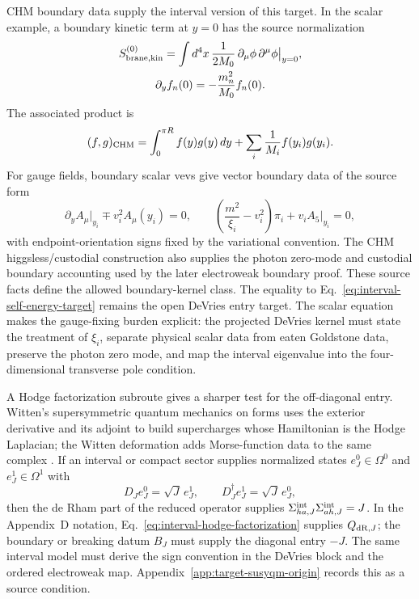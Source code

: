 CHM boundary data supply the interval version of this target.  In the scalar
example, a boundary kinetic term at \(y=0\) has the source normalization
\begin{equation}
  \begin{gathered}
  S_{\rm brane,kin}^{(0)}
  =
  \int d^4x\,\frac{1}{2M_0}\,
  \partial_\mu\phi\,\partial^\mu\phi\big|_{y=0},\\
  \partial_y f_n(0)
  =
  -\frac{m_n^2}{M_0}f_n(0).
  \end{gathered}
  \label{eq:chm-boundary-kinetic-source-normalization}
\end{equation}
The associated product is
\begin{equation}
  (f,g)_{\rm CHM}
  =
  \int_0^{\pi R} f(y)g(y)\,dy
  +
  \sum_i \frac{1}{M_i}f(y_i)g(y_i).
  \label{eq:chm-boundary-kinetic-data}
\end{equation}
For gauge fields, boundary scalar vevs give vector boundary data of the
source form
\begin{equation}
  \partial_y A_\mu\big|_{y_i}\mp v_i^2A_\mu(y_i)=0,
  \qquad
  \left(\frac{m^2}{\xi_i}-v_i^2\right)\pi_i+v_iA_5\big|_{y_i}=0,
  \label{eq:chm-boundary-vector-scalar-data}
\end{equation}
with endpoint-orientation signs fixed by the variational convention.  The
CHM higgsless/custodial construction also supplies the photon zero-mode and
custodial boundary accounting used by the later electroweak boundary proof.
These source facts define the allowed boundary-kernel class.  The equality to
Eq.~\eqref{eq:interval-self-energy-target} remains the open DeVries entry
target.
The scalar equation makes the gauge-fixing burden explicit: the projected
DeVries kernel must state the treatment of \(\xi_i\), separate physical
scalar data from eaten Goldstone data, preserve the photon zero mode, and map
the interval eigenvalue into the four-dimensional transverse pole condition.

A Hodge factorization subroute gives a sharper test for the off-diagonal entry.
Witten's supersymmetric quantum mechanics on forms uses the exterior derivative
and its adjoint to build supercharges whose Hamiltonian is the Hodge Laplacian;
the Witten deformation adds Morse-function data to the same complex
\cite{WittenMorse1982}.  If an interval or compact sector supplies normalized
states \(e^0_J\in\Omega^0\) and \(e^1_J\in\Omega^1\) with
\begin{equation}
  D_Je^0_J=\sqrt J\,e^1_J,\qquad
  D_J^\dagger e^1_J=\sqrt J\,e^0_J,
  \label{eq:interval-hodge-factorization}
\end{equation}
then the de Rham part of the reduced operator supplies
\(\Sigma_{ha,J}^{\rm int}\Sigma_{ah,J}^{\rm int}=J\).  In the Appendix~D notation,
Eq.~\eqref{eq:interval-hodge-factorization} supplies \(Q_{{\rm dR},J}\); the
boundary or breaking datum \(B_J\) must supply the diagonal entry \(-J\).  The
same interval model must derive the sign convention in the DeVries block and
the ordered electroweak map.  Appendix~\ref{app:target-susyqm-origin} records
this as a source condition.

